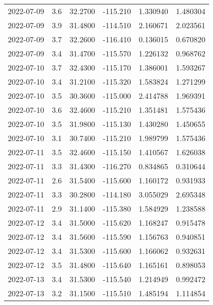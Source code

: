 \begin{tabular}{lrrrrr}
2022-07-09 &       3.6 &  32.2700 &  -115.210 &         1.330940 &         1.480304 \\
2022-07-09 &       3.9 &  31.4800 &  -114.510 &         2.160671 &         2.023561 \\
2022-07-09 &       3.7 &  32.2600 &  -116.410 &         0.136015 &         0.670820 \\
2022-07-09 &       3.4 &  31.4700 &  -115.570 &         1.226132 &         0.968762 \\
2022-07-10 &       3.7 &  32.4300 &  -115.170 &         1.386001 &         1.593267 \\
2022-07-10 &       3.4 &  31.2100 &  -115.320 &         1.583824 &         1.271299 \\
2022-07-10 &       3.5 &  30.3600 &  -115.000 &         2.414788 &         1.969391 \\
2022-07-10 &       3.6 &  32.4600 &  -115.210 &         1.351481 &         1.575436 \\
2022-07-10 &       3.5 &  31.9800 &  -115.130 &         1.430280 &         1.450655 \\
2022-07-10 &       3.1 &  30.7400 &  -115.210 &         1.989799 &         1.575436 \\
2022-07-11 &       3.5 &  32.4600 &  -115.150 &         1.410567 &         1.626038 \\
2022-07-11 &       3.3 &  31.4300 &  -116.270 &         0.834865 &         0.310644 \\
2022-07-11 &       2.6 &  31.5400 &  -115.600 &         1.160172 &         0.931933 \\
2022-07-11 &       3.3 &  30.2800 &  -114.180 &         3.055029 &         2.695348 \\
2022-07-11 &       2.9 &  31.1400 &  -115.380 &         1.584929 &         1.238588 \\
2022-07-12 &       3.4 &  31.5000 &  -115.620 &         1.168247 &         0.915478 \\
2022-07-12 &       3.4 &  31.5600 &  -115.590 &         1.156763 &         0.940851 \\
2022-07-12 &       3.4 &  31.5300 &  -115.600 &         1.166062 &         0.932631 \\
2022-07-12 &       3.5 &  31.4800 &  -115.640 &         1.165161 &         0.898053 \\
2022-07-13 &       3.4 &  31.5300 &  -115.540 &         1.214949 &         0.992472 \\
2022-07-13 &       3.2 &  31.1500 &  -115.510 &         1.485194 &         1.114854 \\

\end{tabular}
